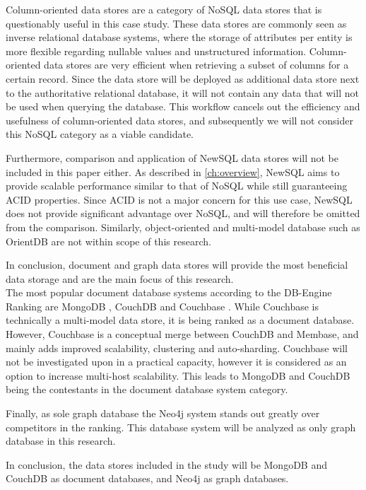 Column-oriented data stores are a category of NoSQL data stores that is questionably useful in this case study.
These data stores are commonly seen as inverse relational database systems, where the storage of attributes per entity is more flexible regarding nullable values and unstructured information.
Column-oriented data stores are very efficient when retrieving a subset of columns for a certain record.
Since the data store will be deployed as additional data store next to the authoritative relational database, it will not contain any data that will not be used when querying the database.
This workflow cancels out the efficiency and usefulness of column-oriented data stores, and subsequently we will not consider this NoSQL category as a viable candidate.

Furthermore, comparison and application of NewSQL data stores will not be included in this paper either.
As described in \cref{ch:overview}, NewSQL aims to provide scalable performance similar to that of NoSQL while still guaranteeing ACID properties.
Since ACID is not a major concern for this use case, NewSQL does not provide significant advantage over NoSQL, and will therefore be omitted from the comparison.
Similarly, object-oriented and multi-model database such as OrientDB \autocite{OrientDB2010} are not within scope of this research.

In conclusion, document and graph data stores will provide the most beneficial data storage and are the main focus of this research.\\

The most popular document database systems according to the DB-Engine Ranking are MongoDB \autocite{MongoDB2009}, CouchDB \autocite{CouchDB2005} and Couchbase \autocite{Couchbase2010}.
While Couchbase is technically a multi-model data store, it is being ranked as a document database.
However, Couchbase is a conceptual merge between CouchDB and Membase, and mainly adds improved scalability, clustering and auto-sharding.
Couchbase will not be investigated upon in a practical capacity, however it is considered as an option to increase multi-host scalability.
This leads to MongoDB and CouchDB being the contestants in the document database system category.

Finally, as sole graph database the Neo4j system \autocite{Neo4j2007} stands out greatly over competitors in the ranking.
This database system will be analyzed as only graph database in this research.

In conclusion, the data stores included in the study will be MongoDB and CouchDB as document databases, and Neo4j as graph databases.

